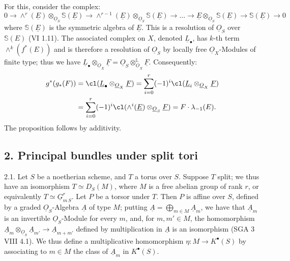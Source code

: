 %
For this, consider the complex:
\[
0\longrightarrow \wedge^r(\underline{E})\otimes_{\underline{O}_S}\mathbb S(\underline{E})\longrightarrow
\wedge^{r-1}(\underline{E})\otimes_{\underline{O}_S}\mathbb S(\underline{E})\longrightarrow\ldots\longrightarrow
\underline{E}\otimes_{\underline{O}_S}\mathbb S(\underline{E})\longrightarrow \mathbb S(\underline{E})\longrightarrow 0
\]
where $\mathbb S(\underline{E})$ is the symmetric algebra of $\underline{E}$. This is a resolution of $\underline{O}_S$ over $\mathbb S(E)$ (VI 1.11). The associated complex on $X$, denoted $\underline{L}_\bullet$, has $k$-th term $\wedge^k(f^*(E))$ and is therefore a resolution of $\underline{O}_S$ by locally free $\underline{O}_X$-Modules of finite type; thus we have \(\underline{L}_\bullet\otimes_{\underline{O}_X}\underline{F}=\underline{O}_S\otimes^{\mathbb L}_{\underline{O}_X}\underline{F}\). Consequently:
\[
\begin{aligned}
g^*(g_*(F))
&=\cl(\underline{L}_\bullet\otimes_{\underline{O}_X}\underline{F})
=\sum_{i=0}^r(-1)^i\cl(\underline{L}_i\otimes_{\underline{O}_X}\underline{F})\\
&=\sum_{i=0}^r(-1)^i\cl(\wedge^i(\underline{E})\otimes_{\underline{O}_S}\underline{F})
=F\cdot\lambda_{-1}(E).
\end{aligned}
\]
The proposition follows by additivity.

\subsection*{2. Principal bundles under split tori}

2.1. Let $S$ be a noetherian scheme, and $T$ a torus over $S$. Suppose $T$ split; we thus have an isomorphism $T\simeq D_S(M)$, where $M$ is a free abelian group of rank $r$, or equivalently $T\simeq \underline{G}_{m\,S}^r$. Let $P$ be a torsor under $T$. Then $P$ is affine over $S$, defined by a graded $\underline{O}_S$-Algebra $\underline{A}$ of type $M$; putting $\underline{A}=\bigoplus_{m\in M}\underline{A}_m$, we have that $\underline{A}_m$ is an invertible $\underline{O}_S$-Module for every $m$, and, for $m,m'\in M$, the homomorphism $\underline{A}_m\otimes_{\underline{O}_S}\underline{A}_{m'}\longrightarrow \underline{A}_{m+m'}$ defined by multiplication in $\underline{A}$ is an isomorphism (SGA 3 VIII 4.1). We thus define a multiplicative homomorphism $\eta:M\longrightarrow K^{\bullet}(S)$ by associating to $m\in M$ the class of $\underline{A}_m$ in $K^{\bullet}(S)$.
